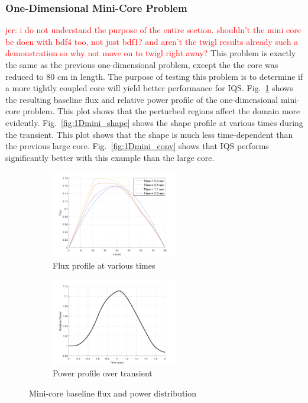\documentclass{elsarticle}
\newcommand{\fig}[1]{Fig.~\ref{#1}}                      %
\newcommand{\jcr}[1]{\textcolor{red}{jcr: #1}}
\begin{document}
\subsubsection{One-Dimensional Mini-Core Problem}
\jcr{i do not understand the purpose of the entire section. shouldn't the mini core be doen with bdf4 too, not just bdf1? and aren't the twigl results already such a demonstration so why not move on to twigl right away?}
This problem is exactly the same as the previous one-dimensional problem, except the the core was reduced to 80 cm in length. The purpose of testing this problem is to determine if a more tightly coupled core will yield better performance for IQS. \fig{fig:1Dmini_flux} shows the resulting baseline flux and relative power profile of the one-dimensional mini-core problem. This plot shows that the perturbed regions affect the domain more evidently. \fig{fig:1Dmini_shape} shows the shape profile at various times during the transient. This plot shows that the shape is much less time-dependent than the previous large core. \fig{fig:1Dmini_conv} shows that IQS performs significantly better with this example than the large core.

\begin{figure}[!htbp]
\centering
\begin{subfigure}[b]{\linewidth}
\centering
\includegraphics[height=1.5in]{figures/1Dmini_flux.png}
\caption{Flux profile at various times}
\end{subfigure}
\begin{subfigure}[b]{\linewidth}
\centering
\includegraphics[height=1.5in]{figures/1Dmini_power_base.png}
\caption{Power profile over transient}
\end{subfigure}
\caption{Mini-core baseline flux and power distribution}
\label{fig:1Dmini_flux}
\end{figure}
\end{document}
